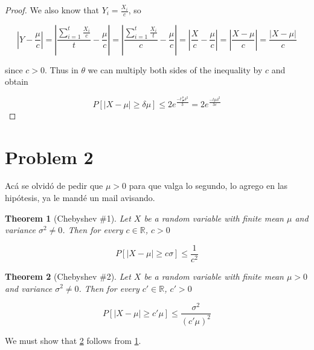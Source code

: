 \documentclass[11pt]{amsart}
\newtheorem{theorem}{Theorem}[section]
\begin{document}
\begin{proof}
We also know that $Y_i = \frac{X_i}{c}$, so 

$$\left|Y - \frac{\mu}{c}\right| = 
\left|\frac{\sum_{i=1}^t \frac{X_i}{c}}{t} - \frac{\mu}{c}\right| = 
\left|\frac{\sum_{i=1}^t \frac{X_i}{t}}{c} - \frac{\mu}{c}\right| = 
\left|\frac{X}{c} - \frac{\mu}{c}\right| = \left|\frac{X - \mu}{c}\right| = \frac{\left|X - \mu\right|}{c}$$

since $c > 0$. Thus in $\theta$ we can multiply both sides of the inequality by $c$ and obtain

$$
P\left[\left|X - \mu\right| \ge \delta \mu\right] \le 2 e^{\frac{-t \frac{\mu}{c} \delta^2}{3}} = 2 e^{\frac{-t \mu \delta^2}{3c}}
$$


\end{proof}


\section*{Problem 2}
\addtocounter{section}{1}
\setcounter{theorem}{0}

{\color{red}
Acá se olvidó de pedir que $\mu > 0$ para que valga lo segundo, lo agrego en las hipótesis, ya le mandé un mail avisando.
}

\begin{theorem}[Chebyshev \#1]\label{cheb1}
Let $X$ be a random variable with finite mean $\mu$ and variance $\sigma^2 \ne 0$. Then for every $c \in \mathbb{R}$, $c > 0$

$$
P\left[|X - \mu| \ge c \sigma\right] \le \frac{1}{c^2}
$$
\end{theorem}

\begin{theorem}[Chebyshev \#2]\label{cheb2}
Let $X$ be a random variable with finite mean $\mu > 0$ and variance $\sigma^2 \ne 0$. Then for every $c' \in \mathbb{R}$, $c' > 0$

$$
P\left[|X - \mu| \ge c' \mu\right] \le \frac{\sigma^2}{(c'\mu)^2}
$$
\end{theorem}

We must show that \ref{cheb2} follows from \ref{cheb1}.
\end{document}

